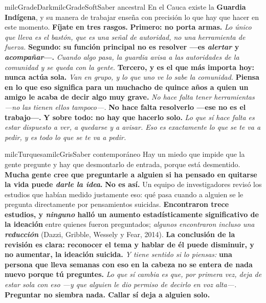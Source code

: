 \documentclass[11pt,letterpaper]{article}
\begin{document}
\begin{softbox}{milcGradeDark}{milcGradeSoft}{Saber ancestral}
En el Cauca existe la \textbf{Guardia Indígena}, y su manera de trabajar enseña con precisión lo que hay que hacer en este momento. \textbf{Fíjate en tres rasgos.} \textbf{Primero: no porta armas.} \emph{Lo único que lleva es el bastón, que es una señal de autoridad, no una herramienta de fuerza.} \textbf{Segundo: su función principal no es resolver ---es \emph{alertar} y \emph{acompañar}---.} \emph{Cuando algo pasa, la guardia avisa a las autoridades de la comunidad y se queda con la gente.} \textbf{Tercero, y es el que más importa hoy: nunca actúa sola.} \emph{Van en grupo, y lo que uno ve lo sabe la comunidad.} \textbf{Piensa en lo que eso significa para un muchacho de quince años a quien un amigo le acaba de decir algo muy grave.} \emph{No hace falta tener herramientas ---no las tienen ellos tampoco---.} \textbf{No hace falta resolverlo ---ese no es el trabajo---.} \textbf{Y sobre todo: no hay que hacerlo solo.} \emph{Lo que sí hace falta es estar dispuesto a ver, a quedarse y a avisar. Eso es exactamente lo que se te va a pedir, y es todo lo que se te va a pedir.}
\end{softbox}

\begin{softbox}{milcTurquesa}{milcGris}{Saber contemporáneo}
Hay un miedo que impide que la gente pregunte y hay que desmontarlo de entrada, porque está desmentido. \textbf{Mucha gente cree que preguntarle a alguien si ha pensado en quitarse la vida puede \emph{darle la idea}.} \textbf{No es así.} Un equipo de investigadores revisó los estudios que habían medido justamente eso: qué pasa cuando a alguien se le pregunta directamente por pensamientos suicidas. \textbf{Encontraron trece estudios, y \emph{ninguno} halló un aumento estadísticamente significativo de la ideación} entre quienes fueron preguntados; \emph{algunos encontraron incluso una \textbf{reducción}} (Dazzi, Gribble, Wessely y Fear, 2014). \textbf{La conclusión de la revisión es clara: reconocer el tema y hablar de él puede disminuir, y no aumentar, la ideación suicida.} \emph{Y tiene sentido si lo piensas:} \textbf{una persona que lleva semanas con eso en la cabeza no se entera de nada nuevo porque tú preguntes.} \emph{Lo que sí cambia es que, por primera vez, deja de estar sola con eso ---y que alguien le dio permiso de decirlo en voz alta---.} \textbf{Preguntar no siembra nada. Callar sí deja a alguien solo.}
\end{softbox}
\end{document}
